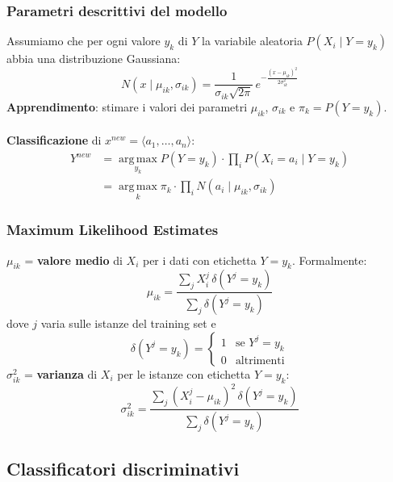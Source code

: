\documentclass[a4paper,12pt]{article}
\newcommand{\argmax}{\operatorname*{arg\,max}}
\begin{document}
\subsubsection{Parametri descrittivi del modello}
Assumiamo che per ogni valore $y_k$ di $Y$ la variabile aleatoria $P(X_i \mid Y = y_k)$ abbia una distribuzione Gaussiana:
\[
N(x \mid \mu_{ik}, \sigma_{ik}) = \frac{1}{\sigma_{ik}\sqrt{2\pi}}\, e^{-\frac{(x-\mu_{ik})^2}{2\sigma_{ik}^2}}
\]
\textbf{Apprendimento}: stimare i valori dei parametri $\mu_{ik}$, $\sigma_{ik}$ e $\pi_k = P(Y = y_k)$.\\
\vspace{1px}\\
\textbf{Classificazione} di $x^{new} = \langle a_1, \dots, a_n \rangle$:
\begin{align*}
Y^{new} &= \argmax_{y_k} P(Y = y_k) \cdot \prod_i P(X_i = a_i \mid Y = y_k)\\
        &= \argmax_{k} \pi_k \cdot \prod_i N(a_i \mid \mu_{ik}, \sigma_{ik})
\end{align*}

\subsubsection{Maximum Likelihood Estimates}
$\mu_{ik}$ = \textbf{valore medio} di $X_i$ per i dati con etichetta $Y = y_k$. Formalmente:
\[
\mu_{ik} = \frac{\sum_j X_i^j\, \delta(Y^j = y_k)}{\sum_j \delta(Y^j = y_k)}
\]
dove $j$ varia sulle istanze del training set e
\[
\delta(Y^j = y_k) =
\begin{cases}
1 & \text{se } Y^j = y_k\\
0 & \text{altrimenti}
\end{cases}
\]
$\sigma_{ik}^2$ = \textbf{varianza} di $X_i$ per le istanze con etichetta $Y = y_k$:
\[
\sigma_{ik}^2 = \frac{\sum_j (X_i^j - \mu_{ik})^2\, \delta(Y^j = y_k)}{\sum_j \delta(Y^j = y_k)}
\]

\subsection{Classificatori discriminativi}
\end{document}
